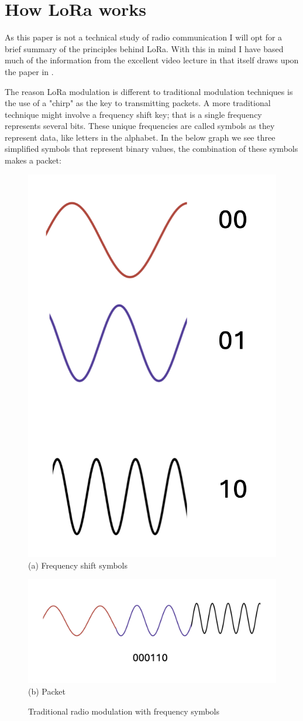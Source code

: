\section{How LoRa works}\label{app:lora-explained}

As this paper is not a technical study of radio communication I will opt for a
brief summary of the principles behind LoRa. With this in mind I have based much
of the information from the excellent video lecture in \cite{visualelectric2021}
that itself draws upon the paper in \cite{vangelista2017}.

The reason LoRa modulation is different to traditional modulation techniques is
the use of a "chirp" as the key to transmitting packets. A more traditional
technique might involve a frequency shift key; that is a single frequency
represents several bits. These unique frequencies are called symbols as they
represent data, like letters in the alphabet. In the below graph we see three
simplified symbols that represent binary values, the combination of these
symbols makes a packet:

\begin{figure}[H]
  \centering
  \begin{minipage}{0.48\textwidth}
    \centering
    \includegraphics[width=0.4\linewidth]{contents/part-1/fig1/frequencysymbols.png}
    \\[4pt]
    {\small (a) Frequency shift symbols} \end{minipage}\hfill
  \begin{minipage}{0.48\textwidth}
    \centering
    \includegraphics[width=1\linewidth]{contents/part-1/fig1/packet.png}
    \\[4pt]
    {\small (b) Packet}
  \end{minipage}
  \caption{ Traditional radio modulation with frequency symbols}
  \label{fig:freq-and-packet}
\end{figure}

